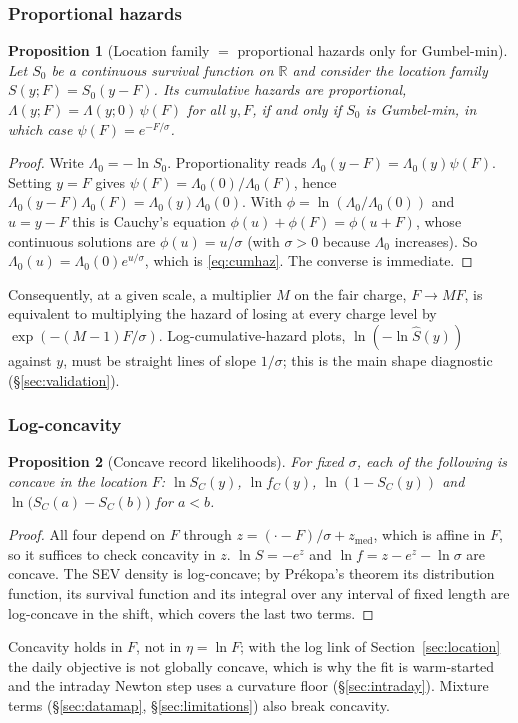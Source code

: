 \documentclass[11pt,a4paper]{article}
\newtheorem{proposition}{Proposition}
\theoremstyle{definition}
\theoremstyle{remark}
\newcommand{\R}{\mathbb{R}}
\newcommand{\zm}{z_{\mathrm{med}}}
\begin{document}
\subsubsection{Proportional hazards}
\begin{proposition}[Location family $=$ proportional hazards only for Gumbel-min]\label{prop:ph}
Let $S_0$ be a continuous survival function on $\R$ and consider the location family $S(y;F)=S_0(y-F)$. Its cumulative hazards are proportional, $\Lambda(y;F)=\Lambda(y;0)\,\psi(F)$ for all $y,F$, if and only if $S_0$ is Gumbel-min, in which case $\psi(F)=e^{-F/\sigma}$.
\end{proposition}
\begin{proof}
Write $\Lambda_0=-\ln S_0$. Proportionality reads $\Lambda_0(y-F)=\Lambda_0(y)\psi(F)$. Setting $y=F$ gives $\psi(F)=\Lambda_0(0)/\Lambda_0(F)$, hence $\Lambda_0(y-F)\Lambda_0(F)=\Lambda_0(y)\Lambda_0(0)$. With $\phi=\ln(\Lambda_0/\Lambda_0(0))$ and $u=y-F$ this is Cauchy's equation $\phi(u)+\phi(F)=\phi(u+F)$, whose continuous solutions are $\phi(u)=u/\sigma$ (with $\sigma>0$ because $\Lambda_0$ increases). So $\Lambda_0(u)=\Lambda_0(0)e^{u/\sigma}$, which is \eqref{eq:cumhaz}. The converse is immediate.
\end{proof}
Consequently, at a given scale, a multiplier $M$ on the fair charge, $F\to MF$, is equivalent to multiplying the hazard of losing at every charge level by $\exp(-(M-1)F/\sigma)$. Log-cumulative-hazard plots, $\ln(-\ln\hat S(y))$ against $y$, must be straight lines of slope $1/\sigma$; this is the main shape diagnostic (\S\ref{sec:validation}).

\subsubsection{Log-concavity}
\begin{proposition}[Concave record likelihoods]\label{prop:logconcave}
For fixed $\sigma$, each of the following is concave in the location $F$: $\ln S_C(y)$, $\ln f_C(y)$, $\ln(1-S_C(y))$ and $\ln\bigl(S_C(a)-S_C(b)\bigr)$ for $a<b$.
\end{proposition}
\begin{proof}
All four depend on $F$ through $z=(\cdot-F)/\sigma+\zm$, which is affine in $F$, so it suffices to check concavity in $z$. $\ln S=-e^{z}$ and $\ln f=z-e^{z}-\ln\sigma$ are concave. The SEV density is log-concave; by Prékopa's theorem its distribution function, its survival function and its integral over any interval of fixed length are log-concave in the shift, which covers the last two terms.
\end{proof}
Concavity holds in $F$, not in $\eta=\ln F$; with the log link of Section~\ref{sec:location} the daily objective is not globally concave, which is why the fit is warm-started and the intraday Newton step uses a curvature floor (\S\ref{sec:intraday}). Mixture terms (\S\ref{sec:datamap}, \S\ref{sec:limitations}) also break concavity.
\end{document}
